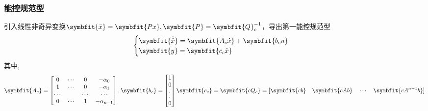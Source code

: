 \documentclass[11pt,a4paper]{ctexart}
\newcommand{\bm}{\symbfit}
\begin{document}
        \subsubsection{能控规范型}
            引入线性非奇异变换$\bm{\bar x}=\bm{Px},\bm{P}=\bm{Q}_c^{-1}$，导出第一能控规范型
            \[
            \begin{cases}
            \bm{\dot{\hat x}}=\bm{A_c\hat x}+\bm{b_c u}\\
            \bm{y}=\bm{c_c\hat x}
            \end{cases}
            \]
            其中,
            \[
            \bm{A_c}=\begin{bmatrix}
                0 & \cdots & 0 & -\alpha_0 \\
                1 & \cdots & 0 & -\alpha_1 \\
                \cdots &  & \cdots & \cdots \\
                0 & \cdots & 1 & -\alpha_{n-1} \\
            \end{bmatrix},
            \bm{b_c}=\begin{bmatrix}
                1\\0\\ \vdots \\ 0 \\
            \end{bmatrix}
            \bm{c_c}=\bm{cQ_c}=[\bm{cb}\quad\bm{cAb}\quad\cdots\quad\bm{cA^{n-1}b}]
            \]
\end{document}
